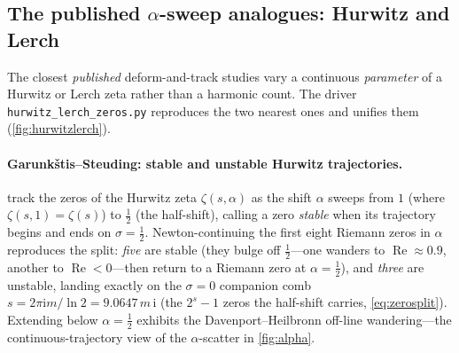 \documentclass[11pt]{article}
\theoremstyle{definition}
\renewcommand{\Re}{\operatorname{Re}}
\newcommand{\iu}{\mathrm{i}}
\begin{document}
\subsection{The published $\alpha$-sweep analogues: Hurwitz and Lerch}
\label{app:hurwitzlerch}

The closest \emph{published} deform-and-track studies vary a continuous
\emph{parameter} of a Hurwitz or Lerch zeta rather than a harmonic count. The driver
\texttt{hurwitz\_lerch\_zeros.py} reproduces the two nearest ones and unifies them
(\cref{fig:hurwitzlerch}).

\paragraph{Garunk\v{s}tis--Steuding: stable and unstable Hurwitz trajectories.}
\citet{GarunkstisSteuding2007} track the zeros of the Hurwitz zeta $\zeta(s,\alpha)$
as the shift $\alpha$ sweeps from $1$ (where $\zeta(s,1)=\zeta(s)$) to $\tfrac12$ (the
half-shift), calling a zero \emph{stable} when its trajectory begins and ends on
$\sigma=\tfrac12$. Newton-continuing the first eight Riemann zeros in $\alpha$
reproduces the split: \emph{five} are stable (they bulge off $\tfrac12$---one wanders
to $\Re\approx0.9$, another to $\Re<0$---then return to a Riemann zero at
$\alpha=\tfrac12$), and \emph{three} are unstable, landing exactly on the $\sigma=0$
companion comb $s=2\pi\iu m/\ln2=9.0647\,m\,\iu$ (the $2^{s}-1$ zeros the half-shift
carries, \eqref{eq:zerosplit}). Extending below $\alpha=\tfrac12$ exhibits the
Davenport--Heilbronn off-line wandering---the continuous-trajectory view of the
$\alpha$-scatter in \cref{fig:alpha}.
\end{document}
